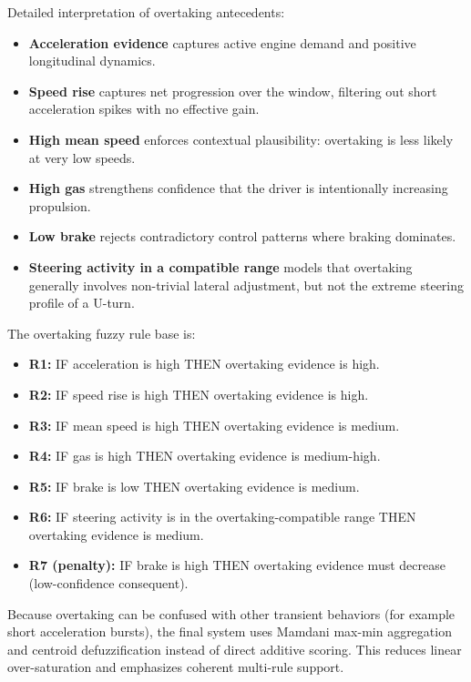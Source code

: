 \documentclass[11pt,a4paper]{article}
\begin{document}
Detailed interpretation of overtaking antecedents:
\begin{itemize}
    \item \textbf{Acceleration evidence} captures active engine demand and positive longitudinal dynamics.
    \item \textbf{Speed rise} captures net progression over the window, filtering out short acceleration spikes with no effective gain.
    \item \textbf{High mean speed} enforces contextual plausibility: overtaking is less likely at very low speeds.
    \item \textbf{High gas} strengthens confidence that the driver is intentionally increasing propulsion.
    \item \textbf{Low brake} rejects contradictory control patterns where braking dominates.
    \item \textbf{Steering activity in a compatible range} models that overtaking generally involves non-trivial lateral adjustment, but not the extreme steering profile of a U-turn.
\end{itemize}

The overtaking fuzzy rule base is:
\begin{itemize}
    \item \textbf{R1:} IF acceleration is high THEN overtaking evidence is high.
    \item \textbf{R2:} IF speed rise is high THEN overtaking evidence is high.
    \item \textbf{R3:} IF mean speed is high THEN overtaking evidence is medium.
    \item \textbf{R4:} IF gas is high THEN overtaking evidence is medium-high.
    \item \textbf{R5:} IF brake is low THEN overtaking evidence is medium.
    \item \textbf{R6:} IF steering activity is in the overtaking-compatible range THEN overtaking evidence is medium.
    \item \textbf{R7 (penalty):} IF brake is high THEN overtaking evidence must decrease (low-confidence consequent).
\end{itemize}

Because overtaking can be confused with other transient behaviors (for example short acceleration bursts), the final system uses Mamdani max-min aggregation and centroid defuzzification instead of direct additive scoring. This reduces linear over-saturation and emphasizes coherent multi-rule support.
\end{document}
